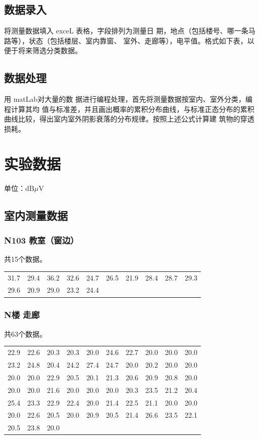 \documentclass{../ElectromagneticFieldTemplate}
\newcommand{\dbmv}{\text{dB}\mu\text{V}}
\begin{document}
\subsection{数据录入}

将测量数据填入 exceL 表格，字段排列为测量日
期，地点（包括楼号、哪一条马路等），状态（包括楼层、室内靠窗、
室外、走廊等），电平值。格式如下表，以便于将来筛选分类数据。

\subsection{数据处理}

用 matLab对大量的数
据进行编程处理，首先将测量数据按室内、室外分类，编程计算其均
值与标准差，并且画出概率的累积分布曲线，与标准正态分布的累积
曲线比较，得出室内室外阴影衰落的分布规律。按照上述公式计算建
筑物的穿透损耗。

\section{实验数据}

单位：$\dbmv$

\subsection{室内测量数据}

\subsubsection{N103 教室（窗边）}
共15个数据。

\begin{longtable}[c]{*{10}{c}}
31.7 & 29.4 & 36.2 & 32.6 & 24.7 & 26.5 & 21.9 & 28.4 & 28.7 & 29.3 \\
29.6 & 20.9 & 29.0 & 23.2 & 24.4 & & & & & \\
\end{longtable}

\subsubsection{N楼 走廊}
共63个数据。

\begin{longtable}[c]{*{10}{c}}
22.9 & 22.6 & 20.3 & 20.3 & 20.0 & 24.6 & 22.7 & 20.0 & 20.0 & 20.0 \\
23.2 & 24.8 & 20.4 & 24.2 & 27.4 & 24.7 & 20.0 & 20.2 & 20.0 & 20.0 \\
20.0 & 20.0 & 22.9 & 20.5 & 20.1 & 21.3 & 20.6 & 20.9 & 20.8 & 20.0 \\
20.0 & 20.0 & 21.6 & 20.0 & 20.0 & 20.0 & 20.3 & 23.5 & 21.2 & 20.4 \\
25.4 & 23.3 & 22.9 & 22.4 & 20.0 & 21.4 & 22.5 & 21.1 & 20.0 & 20.0 \\
20.0 & 22.6 & 20.5 & 20.0 & 20.9 & 20.5 & 21.4 & 26.6 & 23.5 & 22.1 \\
20.5 & 23.8 & 20.0 & & & & & & & \\
\end{longtable}
\end{document}
